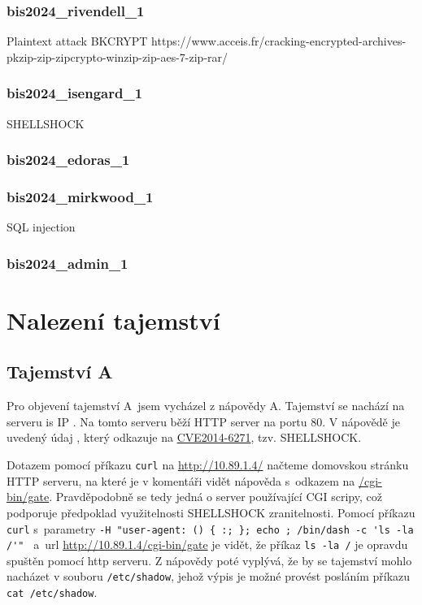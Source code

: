 \documentclass[a4paper, 11pt]{article}
\begin{document}
\subsubsection{bis2024\_rivendell\_1}
Plaintext attack BKCRYPT 
https://www.acceis.fr/cracking-encrypted-archives-pkzip-zip-zipcrypto-winzip-zip-aes-7-zip-rar/

\subsubsection{bis2024\_isengard\_1}
SHELLSHOCK
\subsubsection{bis2024\_edoras\_1}
\subsubsection{bis2024\_mirkwood\_1} 

SQL injection


\subsubsection{bis2024\_admin\_1}



\section{Nalezení tajemství}

\subsection{Tajemství A}
Pro objevení tajemství A~jsem vycházel z nápovědy A. Tajemství se nachází na serveru  is IP . Na tomto serveru běží HTTP server na portu 80. V nápovědě je uvedený údaj , který odkazuje na \href{https://nvd.nist.gov/vuln/detail/cve-2014-6271}{CVE2014-6271}, tzv. SHELLSHOCK.

Dotazem pomocí příkazu \texttt{curl} na \url{http://10.89.1.4/} načteme domovskou stránku HTTP serveru, na které je v komentáři vidět nápověda s~odkazem na \url{/cgi-bin/gate}. Pravděpodobně se tedy jedná o server používající CGI scripy, což podporuje předpoklad využitelnosti SHELLSHOCK zranitelnosti. Pomocí příkazu \texttt{curl} s~parametry \verb|-H "user-agent: () { :; }; echo ; /bin/dash -c 'ls -la /'" | a~url \url{http://10.89.1.4/cgi-bin/gate} je vidět, že příkaz \verb|ls -la /| je opravdu spuštěn pomocí http serveru. Z nápovědy poté vyplývá, že by se tajemství mohlo nacházet v souboru \verb|/etc/shadow|, jehož výpis je možné provést posláním příkazu \verb|cat /etc/shadow|.
\end{document}
